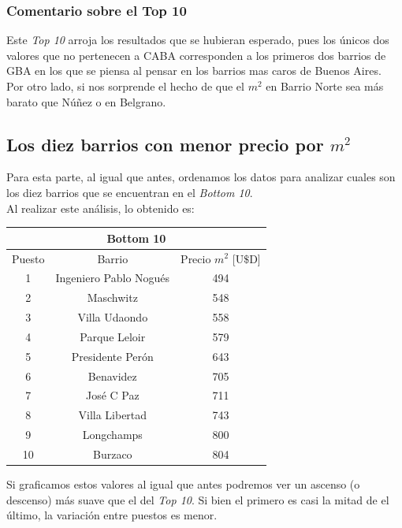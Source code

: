 \documentclass[a4paper, 10pt]{article}
\newcommand\tab[1][0.5cm]{\hspace*{#1}}
\begin{document}
			  	\subsubsection{Comentario sobre el Top 10}
				  	Este \emph{Top 10} arroja los resultados que se hubieran esperado, pues los únicos dos valores que no pertenecen
			  	a CABA corresponden a los primeros dos barrios de GBA en los que se piensa al pensar en los barrios mas caros
			  	de Buenos Aires. \\
			  		\tab Por otro lado, si nos sorprende el hecho de que el $m^2$ en Barrio Norte sea más barato que Núñez o en
			  		Belgrano.
			\subsection{Los diez barrios con menor precio por $m^2$}
				Para esta parte, al igual que antes, ordenamos los datos para analizar cuales son los diez barrios que se encuentran
				en el \emph{Bottom 10}. \\
				\tab Al realizar este análisis, lo obtenido es:
				\begin{center}
					\begin{tabular}{ |c|c|c| }
						\hline
						\multicolumn{3}{|c|}{Bottom 10}\\
						\hline
						\hline
						Puesto & Barrio & Precio $m^2$ [U$\$$D] \\
						\hline
						1 & Ingeniero Pablo Nogués & 494 \\
						2 & Maschwitz & 548 \\
						3 & Villa Udaondo & 558 \\
						4 & Parque Leloir & 579 \\
						5 & Presidente Perón & 643 \\
						6 & Benavidez & 705 \\
						7 & José C Paz & 711 \\
						8 & Villa Libertad & 743 \\
						9 & Longchamps & 800 \\
						10 & Burzaco & 804 \\
						\hline
					\end{tabular}
				\end{center}
				\tab Si graficamos estos valores al igual que antes podremos ver un ascenso (o descenso) más suave que el del
				\emph{Top 10}. Si bien el primero es casi la mitad de el último, la variación entre puestos es menor. \\
\end{document}
